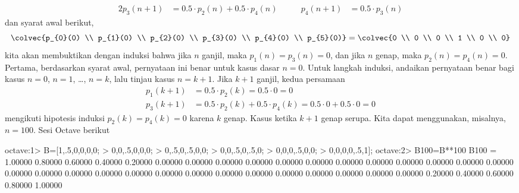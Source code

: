 \begin{exercises}
\begin{answer}
\begin{exparts}
\begin{alignat*}{2}
             p_{3}(n+1) &= 0.5\cdot p_{2}(n)+0.5\cdot p_{4}(n)
             &\qquad
             p_{4}(n+1) &= 0.5\cdot p_{3}(n)             
          \end{alignat*}
          dan syarat awal berikut,
          \begin{equation*}
            \colvec{p_{0}(0) \\ p_{1}(0) \\ p_{2}(0) \\ p_{3}(0) \\ 
                        p_{4}(0) \\ p_{5}(0)}
            =
            \colvec{0 \\ 0 \\ 0 \\ 1 \\ 
                        0 \\ 0}
          \end{equation*} 
          kita akan membuktikan dengan induksi bahwa jika $n$ ganjil, maka
          $p_{1}(n)=p_{3}(n)=0$, dan jika $n$ genap, maka
          $p_{2}(n)=p_{4}(n)=0$.
          Pertama, berdasarkan syarat awal, pernyataan ini benar untuk kasus
          dasar $n=0$.
          Untuk langkah induksi, andaikan pernyataan benar bagi kasus
          $n=0$, $n=1$, \ldots, $n=k$, lalu tinjau kasus $n=k+1$.
          Jika $k+1$ ganjil, kedua persamaan
          \begin{align*}
             p_{1}(k+1) &= 0.5\cdot p_{2}(k)=0.5\cdot 0=0
                                                          \\
             p_{3}(k+1) &=0.5\cdot p_{2}(k)+0.5\cdot p_{4}(k)
                        =0.5\cdot 0+0.5\cdot 0
                        =0
          \end{align*}
          mengikuti hipotesis induksi $p_{2}(k)=p_{4}(k)=0$ karena $k$ genap.
          Kasus ketika $k+1$ genap serupa.
        \partsitem Kita dapat menggunakan, misalnya, $n=100$.
          Sesi Octave berikut
\begin{computercode}
octave:1> B=[1,.5,0,0,0,0;
>             0,0,.5,0,0,0;
>             0,.5,0,.5,0,0;
>             0,0,.5,0,.5,0;
>             0,0,0,.5,0,0;
>             0,0,0,0,.5,1];
octave:2> B100=B**100
B100 =
  1.00000  0.80000  0.60000  0.40000  0.20000  0.00000
  0.00000  0.00000  0.00000  0.00000  0.00000  0.00000
  0.00000  0.00000  0.00000  0.00000  0.00000  0.00000
  0.00000  0.00000  0.00000  0.00000  0.00000  0.00000
  0.00000  0.00000  0.00000  0.00000  0.00000  0.00000
  0.00000  0.20000  0.40000  0.60000  0.80000  1.00000

\end{computercode}
\end{exparts}
\end{answer}
\end{exercises}
